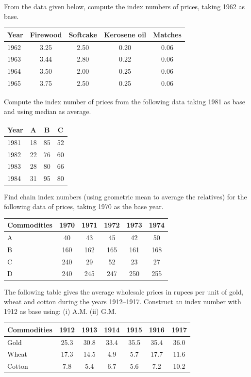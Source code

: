 \documentclass[11pt,a4paper]{article}
\begin{document}
\begin{longlist}
\item From the data given below, compute the index numbers of prices, taking 1962 as base.
\begin{center}
\begin{tabular}{l cccc}
\toprule
Year & Firewood & Softcake & Kerosene oil & Matches \\
\midrule
1962 & 3.25 & 2.50 & 0.20 & 0.06 \\
1963 & 3.44 & 2.80 & 0.22 & 0.06 \\
1964 & 3.50 & 2.00 & 0.25 & 0.06 \\
1965 & 3.75 & 2.50 & 0.25 & 0.06 \\
\bottomrule
\end{tabular}
\end{center}

\item Compute the index number of prices from the following data taking 1981 as base and using median as average.
\begin{center}
\begin{tabular}{l ccc}
\toprule
Year & A & B & C \\
\midrule
1981 & 18 & 85 & 52 \\
1982 & 22 & 76 & 60 \\
1983 & 28 & 80 & 66 \\
1984 & 31 & 95 & 80 \\
\bottomrule
\end{tabular}
\end{center}

\item Find chain index numbers (using geometric mean to average the relatives) for the following data of prices, taking 1970 as the base year.
\begin{center}
\begin{tabular}{l ccccc}
\toprule
Commodities & 1970 & 1971 & 1972 & 1973 & 1974 \\
\midrule
A & 40 & 43 & 45 & 42 & 50 \\
B & 160 & 162 & 165 & 161 & 168 \\
C & 240 & 29 & 52 & 23 & 27 \\
D & 240 & 245 & 247 & 250 & 255 \\
\bottomrule
\end{tabular}
\end{center}

\item The following table gives the average wholesale prices in rupees per unit of gold, wheat and cotton during the years 1912--1917. Construct an index number with 1912 as base using: (i) A.M. (ii) G.M.
\begin{center}
\begin{tabular}{l cccccc}
\toprule
Commodities & 1912 & 1913 & 1914 & 1915 & 1916 & 1917 \\
\midrule
Gold & 25.3 & 30.8 & 33.4 & 35.5 & 35.4 & 36.0 \\
Wheat & 17.3 & 14.5 & 4.9 & 5.7 & 17.7 & 11.6 \\
Cotton & 7.8 & 5.4 & 6.7 & 5.6 & 7.2 & 10.2 \\
\bottomrule
\end{tabular}
\end{center}


\end{longlist}
\end{document}
